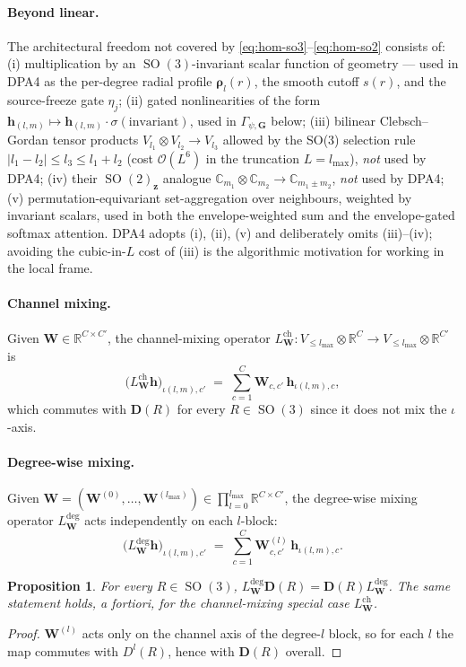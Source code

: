\documentclass[11pt,a4paper]{article}
\DeclareMathOperator{\SO}{SO}
\newcommand{\R}{\mathbb{R}}
\newcommand{\C}{\mathbb{C}}
\newcommand{\bG}{\bm{G}}
\newcommand{\bz}{\bm{z}}
\newcommand{\bh}{\bm{h}}
\newcommand{\bD}{\bm{D}}
\newcommand{\bW}{\bm{W}}
\newcommand{\brho}{\bm{\rho}}
\newcommand{\lmax}{l_{\max}}
\theoremstyle{plain}
\newtheorem{proposition}[theorem]{Proposition}
\theoremstyle{definition}
\theoremstyle{remark}
\begin{document}
    \paragraph{Beyond linear.}
    The architectural freedom not covered by \eqref{eq:hom-so3}--\eqref{eq:hom-so2}
    consists of: (i) multiplication by an $\SO(3)$-invariant scalar function of
    geometry — used in DPA4 as the per-degree radial profile $\brho_l(r)$, the
    smooth cutoff $s(r)$, and the source-freeze gate $\eta_j$; (ii) gated
    nonlinearities of the form
$\bh_{(l,m)}\mapsto\bh_{(l,m)}\cdot\sigma(\text{invariant})$, used in
$\Gamma_{\psi,\bG}$ below; (iii) bilinear Clebsch--Gordan tensor products
$V_{l_1}\otimes V_{l_2}\to V_{l_3}$ allowed by the SO(3) selection rule
$|l_1-l_2|\le l_3\le l_1+l_2$ (cost $\mathcal{O}(L^6)$ in the truncation
$L=\lmax$), \emph{not} used by DPA4; (iv) their $\SO(2)_{\bz}$ analogue
$\C_{m_1}\otimes\C_{m_2}\to\C_{m_1\pm m_2}$, \emph{not} used by DPA4; (v)
    permutation-equivariant set-aggregation over neighbours, weighted by invariant
    scalars, used in both the envelope-weighted sum and the envelope-gated softmax
    attention. DPA4 adopts (i), (ii), (v) and deliberately omits (iii)--(iv);
    avoiding the cubic-in-$L$ cost of (iii) is the algorithmic motivation for
    working in the local frame.

    \paragraph{Channel mixing.}
    Given $\bW\in\R^{C\times C'}$, the channel-mixing operator
$L^{\mathrm{ch}}_{\bW}:V_{\le\lmax}\otimes\R^C\to V_{\le\lmax}\otimes\R^{C'}$
    is
    \begin{equation}
        \bigl(L^{\mathrm{ch}}_{\bW}\bh\bigr)_{\iota(l,m),c'}\;=\;\sum_{c=1}^{C}\bW_{c,c'}\,\bh_{\iota(l,m),c},
    \end{equation}
    which commutes with $\bD(R)$ for every $R\in\SO(3)$ since it does not mix the $\iota$-axis.

    \paragraph{Degree-wise mixing.}
    Given $\bW=(\bW^{(0)},\dots,\bW^{(\lmax)})\in\prod_{l=0}^{\lmax}\R^{C\times
    C'}$, the degree-wise mixing operator $L^{\mathrm{deg}}_{\bW}$ acts
    independently on each $l$-block:
    \begin{equation}
        \bigl(L^{\mathrm{deg}}_{\bW}\bh\bigr)_{\iota(l,m),c'}\;=\;\sum_{c=1}^{C}\bW^{(l)}_{c,c'}\,\bh_{\iota(l,m),c}.
    \end{equation}
    \begin{proposition}\label{prop:so3lin}
    For every $R\in\SO(3)$, $L^{\mathrm{deg}}_{\bW}\bD(R)=\bD(R)L^{\mathrm{deg}}_{\bW}$.
    The same statement holds, a fortiori, for the channel-mixing special case $L^{\mathrm{ch}}_{\bW}$.
    \end{proposition}
    \begin{proof}
$\bW^{(l)}$ acts only on the channel axis of the degree-$l$ block, so for each $l$ the map commutes with $D^l(R)$, hence with $\bD(R)$ overall.
    \end{proof}
\end{document}
